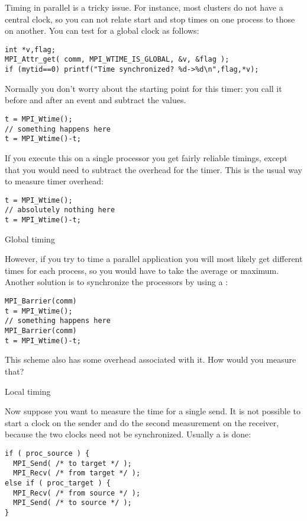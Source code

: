 Timing in parallel is a tricky issue. For instance, most clusters do
not have a central clock, so you can not relate start and stop times
on one process to those on another. You can test for a global clock as
follows:
\begin{lstlisting}
int *v,flag;
MPI_Attr_get( comm, MPI_WTIME_IS_GLOBAL, &v, &flag );
if (mytid==0) printf("Time synchronized? %d->%d\n",flag,*v);
\end{lstlisting}

Normally you don't worry about the starting point for this timer: 
you call it before and after an event and subtract the values.
\begin{lstlisting}
t = MPI_Wtime();
// something happens here
t = MPI_Wtime()-t;
\end{lstlisting}
If you execute this on a single processor you get fairly reliable
timings, except that you would need to subtract the overhead for the
timer. This is the usual way to measure timer overhead:
\begin{lstlisting}
t = MPI_Wtime();
// absolutely nothing here
t = MPI_Wtime()-t;
\end{lstlisting}

 {Global timing}

However, if you try to time a parallel application you will most likely
get different times for each process, so you would have to take the
average or maximum.  Another solution is to synchronize the processors
by using a :
\begin{lstlisting}
MPI_Barrier(comm)
t = MPI_Wtime();
// something happens here
MPI_Barrier(comm)
t = MPI_Wtime()-t;
\end{lstlisting}

\begin{exercise}
  This scheme also has some overhead associated with it. How would you measure that?
\end{exercise}

 {Local timing}
\label{sec:ping-time}

Now suppose you want to measure the time for a single send. It is not possible
to start a clock on the sender and do the second measurement on the receiver,
because the two clocks need not be synchronized. Usually a  is 
done: 
\begin{lstlisting}
if ( proc_source ) {
  MPI_Send( /* to target */ );
  MPI_Recv( /* from target */ );
else if ( proc_target ) {
  MPI_Recv( /* from source */ );
  MPI_Send( /* to source */ );
}
\end{lstlisting}

